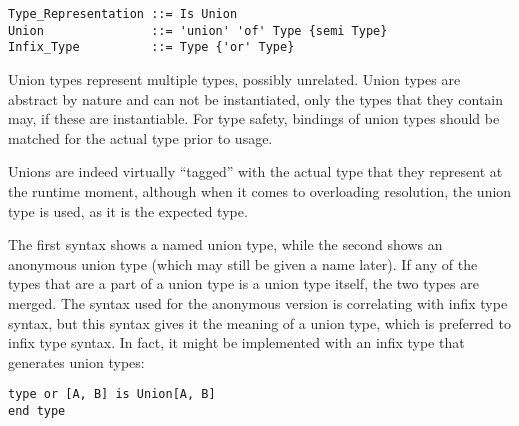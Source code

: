 \syntax\begin{lstlisting}
Type_Representation ::= Is Union
Union               ::= 'union' 'of' Type {semi Type}
Infix_Type          ::= Type {'or' Type}
\end{lstlisting}

Union types represent multiple types, possibly unrelated. Union types are abstract by nature and can not be instantiated, only the types that they contain may, if these are instantiable. For type safety, bindings of union types should be matched for the actual type prior to usage. 

Unions are indeed virtually ``tagged'' with the actual type that they represent at the runtime moment, although when it comes to overloading resolution, the union type is used, as it is the expected type. 

The first syntax shows a named union type, while the second shows an anonymous union type (which may still be given a name later). If any of the types that are a part of a union type is a union type itself, the two types are merged. The syntax used for the anonymous version is correlating with infix type syntax, but this syntax gives it the meaning of a union type, which is preferred to infix type syntax. In fact, it might be implemented with an infix type that generates union types:

\begin{lstlisting}
type or [A, B] is Union[A, B] 
end type
\end{lstlisting}

